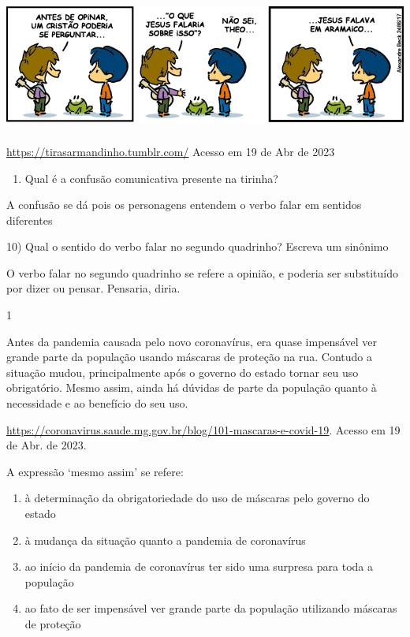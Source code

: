 {\includegraphics[width=5.90551in,height=1.72222in]{./imgSAEB_7_POR/media/image11.png}

\href{https://tirasarmandinho.tumblr.com/}{\uline{https://tirasarmandinho.tumblr.com/}}
Acesso em 19 de Abr de 2023

\begin{enumerate}
\def\labelenumi{\arabic{enumi}.}
\tightlist
\item
  Qual é a confusão comunicativa presente na tirinha?
\end{enumerate}

A confusão se dá pois os personagens entendem o verbo falar em sentidos
diferentes

10) Qual o sentido do verbo falar no segundo quadrinho? Escreva um
sinônimo

O verbo falar no segundo quadrinho se refere a opinião, e poderia ser
substituído por dizer ou pensar. Pensaria, diria.


\num{1}

Antes da pandemia causada pelo novo coronavírus, era quase impensável
ver grande parte da população usando máscaras de proteção na rua.
Contudo a situação mudou, principalmente após o governo do estado tornar
seu uso obrigatório. Mesmo assim, ainda há dúvidas de parte da população
quanto à necessidade e ao benefício do seu uso.

\href{https://coronavirus.saude.mg.gov.br/blog/101-mascaras-e-covid-19}{\uline{https://coronavirus.saude.mg.gov.br/blog/101-mascaras-e-covid-19}}.
Acesso em 19 de Abr. de 2023.

A expressão `mesmo assim' se refere:

\begin{enumerate}
\def\labelenumi{\alph{enumi})}
\item
  à determinação da obrigatoriedade do uso de máscaras pelo governo do
  estado
\item
  à mudança da situação quanto a pandemia de coronavírus
\item
  ao início da pandemia de coronavírus ter sido uma surpresa para toda a
  população
\item
  ao fato de ser impensável ver grande parte da população utilizando
  máscaras de proteção
\end{enumerate}

}
